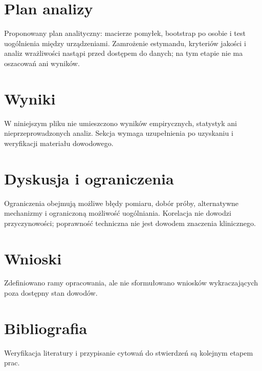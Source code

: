 \documentclass[11pt,a4paper]{article}
\begin{document}
\section{Plan analizy}

Proponowany plan analityczny: macierze pomyłek, bootstrap po osobie i test uogólnienia między urządzeniami. Zamrożenie estymandu, kryteriów jakości i analiz wrażliwości nastąpi przed dostępem do danych; na tym etapie nie ma oszacowań ani wyników.

\section{Wyniki}

W niniejszym pliku nie umieszczono wyników empirycznych, statystyk ani nieprzeprowadzonych analiz. Sekcja wymaga uzupełnienia po uzyskaniu i weryfikacji materiału dowodowego.

\section{Dyskusja i ograniczenia}

Ograniczenia obejmują możliwe błędy pomiaru, dobór próby, alternatywne mechanizmy i ograniczoną możliwość uogólniania. Korelacja nie dowodzi przyczynowości; poprawność techniczna nie jest dowodem znaczenia klinicznego.

\section{Wnioski}

Zdefiniowano ramy opracowania, ale nie sformułowano wniosków wykraczających poza dostępny stan dowodów.

\section*{Bibliografia}

Weryfikacja literatury i przypisanie cytowań do stwierdzeń są kolejnym etapem prac.
\end{document}
